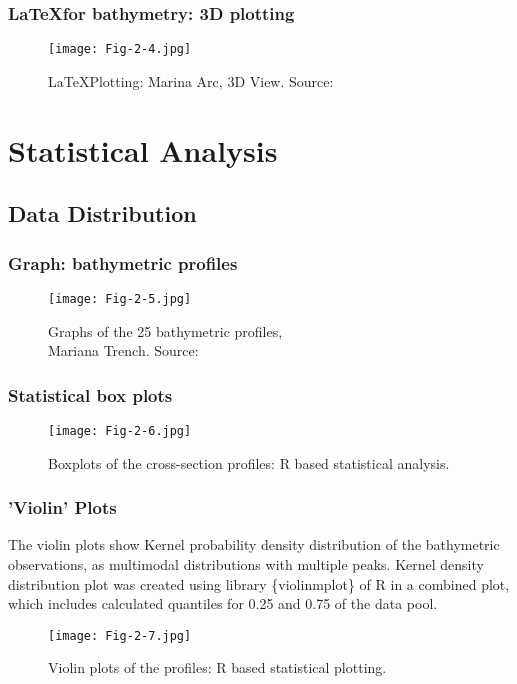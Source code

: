 \documentclass[pdflatex,compress,8pt,
	xcolor={dvipsnames,dvipsnames,svgnames,x11names,table},
	hyperref={colorlinks = true,breaklinks = true, urlcolor = NavyBlue, breaklinks = true}]{beamer}
\begin{document}
\begin{frame}\frametitle{\LaTeX \space for bathymetry: 3D plotting}
\begin{figure}[H]
	\centering
		\texttt{[image: Fig-2-4.jpg]}
	\caption{\LaTeX \space Plotting: Marina Arc, 3D View. Source: \cite{Lemenkova201871}}\label{fig:2-4}
\end{figure}		
\end{frame}



\section{Statistical Analysis}
\subsection{Data Distribution}

\begin{frame}\frametitle{Graph: bathymetric profiles}
\begin{figure}[H]
	\centering
		\texttt{[image: Fig-2-5.jpg]}
	\caption{Graphs of the 25 bathymetric profiles, \\Mariana Trench. Source: \cite{Lemenkova201991}}\label{fig:2-5}
\end{figure}		
\end{frame}

\begin{frame}\frametitle{Statistical box plots}
\begin{figure}[H]
	\centering
		\texttt{[image: Fig-2-6.jpg]}
	\caption{Boxplots of the cross-section profiles: R based statistical analysis. \cite{Lemenkova201871}}
\end{figure}		
\end{frame}

\begin{frame}\frametitle{'Violin' Plots}
The violin plots show Kernel probability density distribution of the bathymetric observations, as multimodal distributions with multiple peaks. Kernel density distribution plot was created using library \{violinmplot\} of R in a combined plot, which includes calculated quantiles for 0.25 and 0.75 of the data pool. 
\begin{figure}[H]
	\centering
		\texttt{[image: Fig-2-7.jpg]}\caption{Violin plots of the profiles: R based statistical plotting. \cite{Lemenkova201866}}
\end{figure}		
\end{frame}
	
\end{document}
